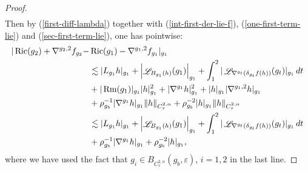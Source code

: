 \documentclass[a4paper,11pt,reqno]{amsart}
\def\Ric{\mathop{\rm Ric}\nolimits}
\def\Rm{\mathop{\rm Rm}\nolimits}
\def\Li{\mathop{\rm \mathscr{L}}\nolimits}
\def\Ric{\mathop{\rm Ric}\nolimits}
\def\Rm{\mathop{\rm Rm}\nolimits}
\def\Li{\mathop{\rm \mathscr{L}}\nolimits}
\numberwithin{equation}{section}
\begin{document}
\begin{proof}
\begin{equation}
\begin{split}
		\end{split}
		\end{equation}
		Then by (\ref{first-diff-lambda}) together with (\ref{int-first-der-lie-f}), (\ref{one-first-term-lie}) and (\ref{sec-first-term-lie}), one has pointwise:
		\begin{equation*}
		\begin{split}
		|\Ric(g_2)+\nabla^{g_2,2}f_{g_2}-&\Ric(g_1)-\nabla^{g_1,2}f_{g_1}|_{g_1}
		\\
		&\lesssim|L_{g_1}h|_{g_1}+\left|\Li_{B_{g_1}(h)}(g_1)\right|_{g_1}+\int_1^2|\Li_{\nabla^{g_t}(\delta_{g_t}f(h))}(g_t)|_{g_1}\,dt\\
		&+|\Rm(g_1)|_{g_1}|h|^2_{g_1}+|\nabla^{g_1}h|_{g_1}^2+|h|_{g_1}|\nabla^{g_1,2}h|_{g_1}\\
		&+\rho_{g_b}^{-1}|\nabla^{g_1}h|_{g_1}\|h\|_{C^{2,\alpha}_{\tau}}+\rho_{g_b}^{-2}|h|_{g_1}\|h\|_{C^{2,\alpha}_{\tau}}\\
		&\lesssim |L_{g_1}h|_{g_1}+\left|\Li_{B_{g_1}(h)}(g_1)\right|_{g_1}+\int_1^2|\Li_{\nabla^{g_t}(\delta_{g_t}f(h))}(g_t)|_{g_1}\,dt\\
		&+\rho_{g_b}^{-1}|\nabla^{g_1}h|_{g_1}+\rho_{g_b}^{-2}|h|_{g_1},
		\end{split}
		\end{equation*}
		where we have used the fact that $g_i\in B_{C^{2,\alpha}_{\tau}}(g_b,\varepsilon)$, $i=1,2$ in the last line.
		

\end{proof}
\end{document}
